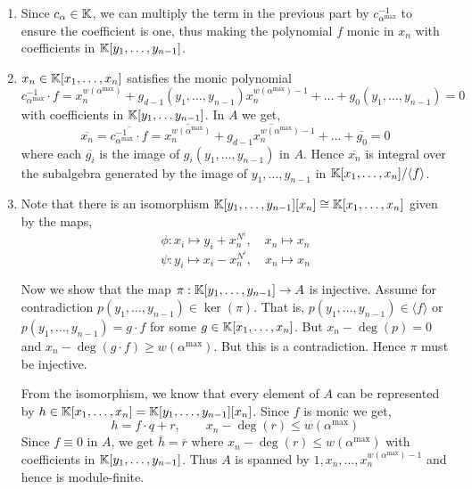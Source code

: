 \documentclass[Notebook.tex]{subfiles}
\begin{document}
\begin{solution}
\begin{enumerate}
        \item Since $c_\alpha \in \mathbb K$, we can multiply the term in the previous part by $c_{\alpha^{\max}}^{-1}$ to ensure the coefficient is one, thus making the polynomial $f$ monic in $x_n$ with coefficients in $\mathbb K[y_1, \ldots, y_{n-1}]$. 
        
        \item ${x_n} \in \mathbb K[x_1, \ldots, x_n]$ satisfies the monic polynomial 
        \[c_{\alpha^{\max}}^{-1} \cdot f = x_n^{w(\alpha^{\max})} + g_{d-1}(y_1, \ldots, y_{n-1})x_n^{w(\alpha^{\max})-1} + \ldots + g_{0}(y_1, \ldots, y_{n-1}) = 0\]
        with coefficients in $\mathbb K[y_1, \ldots y_{n-1}]$. In $A$ we get, 
        \[\overline{x_n} = \overline{c_{\alpha^{\max}}^{-1} \cdot f} = \overline{x_n^{w(\alpha^{\max})}} + \overline{g_{d-1}x_n^{w(\alpha^{\max})-1} }+ \ldots + \overline{g_{0}} = 0\]
        where each $\overline{g_i}$ is the image of $g_i(y_1, \ldots, y_{n-1})$ in $A$. Hence $\overline{x_n}$ is integral over the subalgebra generated by the image of $y_1, \ldots, y_{n-1}$ in $\mathbb K[x_1, \ldots, x_n]/\langle f \rangle$. 
        
        \item Note that there is an isomorphism $\mathbb K[y_1, \ldots, y_{n-1}][x_n] \cong \mathbb K[x_1, \ldots, x_n]$ given by the maps, 
        \[\phi: x_i \mapsto y_i + x_n^{N^i}, \quad x_n \mapsto x_n\]
        \[\psi: y_i \mapsto x_i - x_n^{N^i}, \quad x_n \mapsto x_n\]

        Now we show that the map $\pi: \mathbb K[y_1, \ldots, y_{n-1}] \to A$ is injective. Assume for contradiction $p(y_1, \ldots, y_{n-1}) \in \ker(\pi)$. That is, $p(y_1, \ldots, y_{n-1}) \in \langle f \rangle$ or $p(y_1, \ldots, y_{n-1}) = g \cdot f$  for some $g \in \mathbb K[x_1, \ldots, x_n]$. But $x_n-\deg(p) = 0$ and $x_n-\deg(g \cdot f) \geq w(\alpha^{\max})$. But this is a contradiction. Hence $\pi$ must be injective. 

        From the isomorphism, we know that every element of $A$ can be represented by $h \in \mathbb K[x_1, \ldots, x_n] = \mathbb K[y_1, \ldots, y_{n-1}][x_n]$. Since $f$ is monic we get, 
        \[h = f \cdot q + r, \qquad x_n-\deg(r) \leq w(\alpha^{\max})\]
        Since $f \equiv 0$ in $A$, we get $\overline{h} = \overline{r}$ where $x_n-\deg(r) \leq w(\alpha^{\max})$ with coefficients in $\mathbb K[y_1, \ldots, y_{n-1}]$. Thus $A$ is spanned by $1, x_n, \ldots, x_n^{w(\alpha^{\max})-1 }$ and hence is module-finite.
    \end{enumerate}
\end{solution}
\end{document}
